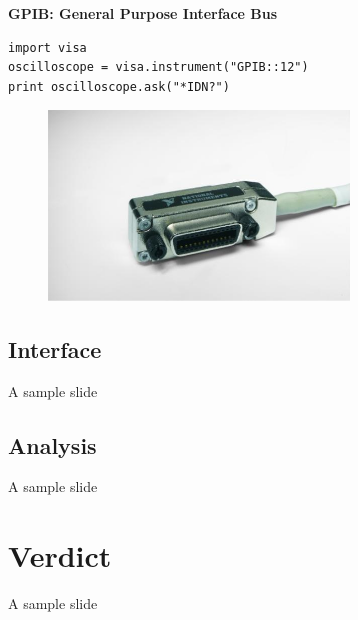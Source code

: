 \documentclass{beamer}
\begin{document}
\begin{frame}[fragile]

\textbf{GPIB: General Purpose Interface Bus}

\begin{verbatim}
import visa
oscilloscope = visa.instrument("GPIB::12")
print oscilloscope.ask("*IDN?")
\end{verbatim}

\begin{figure}[ht]
	\includegraphics[width=8cm]{gpib1.JPG}
\end{figure}

\end{frame}


\subsection{Interface}

\begin{frame}{A sample slide}


\end{frame}

\subsection{Analysis}

\begin{frame}{A sample slide}


\end{frame}

\section{Verdict}

\begin{frame}{A sample slide}


\end{frame}
\end{document}
